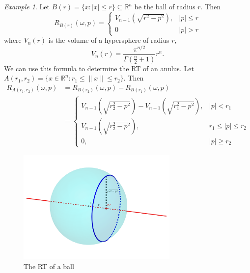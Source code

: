 \documentclass{amsart}
\theoremstyle{remark}
\newtheorem{example}[theorem]{Example}
\numberwithin{equation}{section}
\newcommand{\RR}{\mathbb{R}}
\begin{document}
\begin{example}
Let $B(r) = \{x : |x| \leq r\} \subseteq \RR^n$ be the ball of radius $r$. Then 
\[
    R_{B(r)}(\omega, p) = 
    \begin{cases}
        V_{n-1}(\sqrt{r^2 - p^2}), & |p| \leq r \\
        0 & |p| > r
    \end{cases}    
\]
where $V_n(r)$ is the volume of a hypersphere of radius $r$,
\[
    V_n(r) = \frac{\pi^{n/2}}{\Gamma(\frac n2+1)} r^n.
\]
We can use this formula to determine the RT of an anulus. Let $A(r_1, r_2) = \{x \in \RR^n: r_1 \leq \|x\| \leq r_2\}$. Then
\begin{align*}
    R_{A(r_1, r_2)}(\omega, p) 
    &= R_{B(r_2)}(\omega, p) - R_{B(r_1)}(\omega, p) \\
    &= 
    \begin{cases}
        V_{n-1}(\sqrt{r_2^2 - p^2}) - V_{n-1}(\sqrt{r_1^2 - p^2}), & |p| < r_1 \\
        V_{n-1}(\sqrt{r_2^2 - p^2}), & r_1 \leq |p| \leq r_2 \\
        0, & |p| \geq r_2
    \end{cases}
\end{align*}
\end{example}

\begin{figure}[h]
    \centering
    \includegraphics[width=0.7\textwidth]{Images/Ball RT.png}
    \caption{The RT of a ball}\label{fig:RTBall}
\end{figure}
\end{document}
